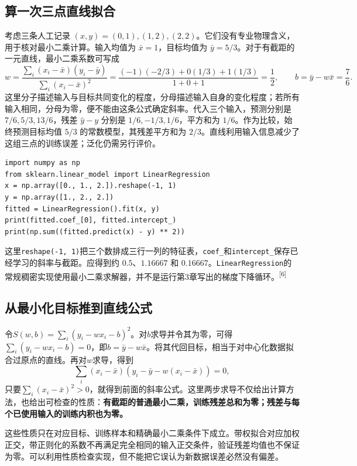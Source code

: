 \subsection*{算一次三点直线拟合}
考虑三条人工记录 $(x,y)=(0,1),(1,2),(2,2)$。它们没有专业物理含义，用于核对最小二乘计算。输入均值为 $\bar x=1$，目标均值为 $\bar y=5/3$。对于有截距的一元直线，最小二乘系数可写成
\[
w=\frac{\sum_i(x_i-\bar x)(y_i-\bar y)}{\sum_i(x_i-\bar x)^2}
=\frac{(-1)(-2/3)+0(1/3)+1(1/3)}{1+0+1}=\frac12,
\qquad b=\bar y-w\bar x=\frac76.
\]
这里分子描述输入与目标共同变化的程度，分母描述输入自身的变化程度；若所有输入相同，分母为零，便不能由这条公式确定斜率。代入三个输入，预测分别是 $7/6,5/3,13/6$，残差 $\hat y-y$ 分别是 $1/6,-1/3,1/6$，平方和为 $1/6$。作为比较，始终预测目标均值 $5/3$ 的常数模型，其残差平方和为 $2/3$。直线利用输入信息减少了这组三点的训练误差；泛化仍需另行评价。

\begin{lstlisting}[caption={用程序核对三点最小二乘结果}]
import numpy as np
from sklearn.linear_model import LinearRegression
x = np.array([0., 1., 2.]).reshape(-1, 1)
y = np.array([1., 2., 2.])
fitted = LinearRegression().fit(x, y)
print(fitted.coef_[0], fitted.intercept_)
print(np.sum((fitted.predict(x) - y) ** 2))
\end{lstlisting}
这里\texttt{reshape(-1, 1)}把三个数排成三行一列的特征表，\texttt{coef\_}和\texttt{intercept\_}保存已经学习的斜率与截距。应得到约 $0.5$、$1.16667$ 和 $0.16667$。\texttt{LinearRegression}的常规稠密实现使用最小二乘求解器，并不是运行第3章写出的梯度下降循环。\textsuperscript{[6]}

\subsection{从最小化目标推到直线公式}
令$S(w,b)=\sum_i(y_i-wx_i-b)^2$。对$b$求导并令其为零，可得$\sum_i(y_i-wx_i-b)=0$，即$b=\bar y-w\bar x$。将其代回目标，相当于对中心化数据拟合过原点的直线。再对$w$求导，得到
\[
\sum_i(x_i-\bar x)(y_i-\bar y-w(x_i-\bar x))=0,
\]
只要$\sum_i(x_i-\bar x)^2>0$，就得到前面的斜率公式。这里两步求导不仅给出计算方法，也给出可检查的性质：\textbf{有截距的普通最小二乘，训练残差总和为零；残差与每个已使用输入的训练内积也为零。}

这些性质只在对应目标、训练样本和精确最小二乘条件下成立。带权拟合对应加权正交，带正则化的系数不再满足完全相同的输入正交条件，验证残差均值也不保证为零。可以利用性质检查实现，但不能把它误认为新数据误差必然没有偏差。

